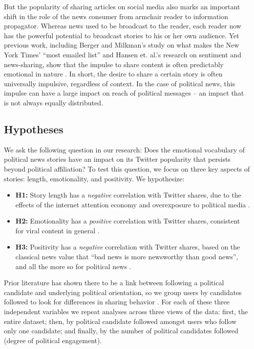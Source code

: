\documentclass[letterpaper]{article}
\begin{document}
But the popularity of sharing articles on social media also marks an important shift in the role of the news consumer from armchair reader to information propagator. Whereas news used to be broadcast to the reader, each reader now has the powerful potential to broadcast stories to his or her own audience. Yet previous work, including Berger and Milkman's study on what makes the New York Times' ``most emailed list'' and Hansen et. al.'s research on sentiment and news-sharing, show that the impulse to share content is often predictably emotional in nature \cite{berger2012makes, hansen2011good}. In short, the desire to share a certain story is often universally impulsive, regardless of context. In the case of political news, this impulse can have a large impact on reach of political messages -- an impact that is not always equally distributed. 

 \subsection{Hypotheses}
We ask the following question in our research: Does the emotional vocabulary of political news stories have an impact on its Twitter popularity that persists beyond political affiliation? To test this question, we focus on three key aspects of stories: length, emotionality, and positivity. We hypothesize:

\begin{itemize} 
    \item \textbf{H1:} Story length has a \emph{negative} correlation with Twitter shares, due to the effects of the internet attention economy and overexposure to political media \cite{goldhaber1997attention}.
    \item \textbf{H2:} Emotionality has a \emph{positive} correlation with Twitter shares, consistent for viral content in general \cite{berger2012makes}.
    \item \textbf{H3:} Positivity has a \emph{negative} correlation with Twitter shares, based on the classical news value that ``bad news is more newsworthy than good news'', and all the more so for political news \cite{galtung1965structure}. 

\end{itemize}

Prior literature has shown there to be a link between following a political candidate and underlying political orientation, so we group users by candidates followed to look for differences in sharing behavior \cite{colleoni2014echo}. For each of these three independent variables we repeat analyses across three views of the data: first, the entire dataset; then, by political candidate followed amongst users who follow only one candidate; and finally, by the number of political candidates followed (degree of political engagement).
\end{document}
